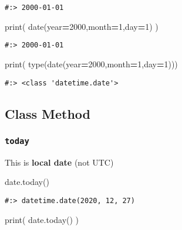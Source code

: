 \documentclass[
]{book}
\newenvironment{Shaded}{\begin{snugshade}}{\end{snugshade}}
\newcommand{\BuiltInTok}[1]{#1}
\newcommand{\DecValTok}[1]{\textcolor[rgb]{0.06,0.06,0.06}{#1}}
\newcommand{\NormalTok}[1]{#1}
\newcommand{\OperatorTok}[1]{\textcolor[rgb]{0.43,0.43,0.43}{\textbf{#1}}}
\begin{document}
\begin{verbatim}
#:> 2000-01-01
\end{verbatim}

\begin{Shaded}
\begin{Highlighting}[]
\BuiltInTok{print}\NormalTok{( date(year}\OperatorTok{=}\DecValTok{2000}\NormalTok{,month}\OperatorTok{=}\DecValTok{1}\NormalTok{,day}\OperatorTok{=}\DecValTok{1}\NormalTok{) )}
\end{Highlighting}
\end{Shaded}

\begin{verbatim}
#:> 2000-01-01
\end{verbatim}

\begin{Shaded}
\begin{Highlighting}[]
\BuiltInTok{print}\NormalTok{( }\BuiltInTok{type}\NormalTok{(date(year}\OperatorTok{=}\DecValTok{2000}\NormalTok{,month}\OperatorTok{=}\DecValTok{1}\NormalTok{,day}\OperatorTok{=}\DecValTok{1}\NormalTok{)))}
\end{Highlighting}
\end{Shaded}

\begin{verbatim}
#:> <class 'datetime.date'>
\end{verbatim}

\hypertarget{class-method}{%
\subsection{Class Method}\label{class-method}}

\hypertarget{today}{%
\subsubsection{\texorpdfstring{\texttt{today}}{today}}\label{today}}

This is \textbf{local date} (not UTC)

\begin{Shaded}
\begin{Highlighting}[]
\NormalTok{date.today()}
\end{Highlighting}
\end{Shaded}

\begin{verbatim}
#:> datetime.date(2020, 12, 27)
\end{verbatim}

\begin{Shaded}
\begin{Highlighting}[]
\BuiltInTok{print}\NormalTok{( date.today() )}
\end{Highlighting}
\end{Shaded}
\end{document}
